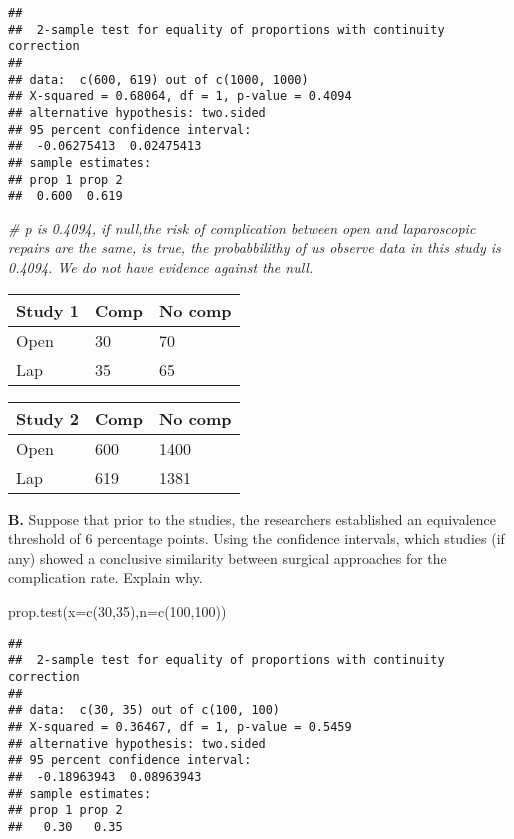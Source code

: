 \documentclass[
]{article}
\newenvironment{Shaded}{\begin{snugshade}}{\end{snugshade}}
\newcommand{\AttributeTok}[1]{\textcolor[rgb]{0.77,0.63,0.00}{#1}}
\newcommand{\CommentTok}[1]{\textcolor[rgb]{0.56,0.35,0.01}{\textit{#1}}}
\newcommand{\DecValTok}[1]{\textcolor[rgb]{0.00,0.00,0.81}{#1}}
\newcommand{\FunctionTok}[1]{\textcolor[rgb]{0.00,0.00,0.00}{#1}}
\newcommand{\NormalTok}[1]{#1}
\begin{document}
\begin{verbatim}
## 
##  2-sample test for equality of proportions with continuity correction
## 
## data:  c(600, 619) out of c(1000, 1000)
## X-squared = 0.68064, df = 1, p-value = 0.4094
## alternative hypothesis: two.sided
## 95 percent confidence interval:
##  -0.06275413  0.02475413
## sample estimates:
## prop 1 prop 2 
##  0.600  0.619
\end{verbatim}

\begin{Shaded}
\begin{Highlighting}[]
\CommentTok{\# p is 0.4094, if null,the risk of complication between open and laparoscopic repairs are the same, is true, the probabbilithy of us observe data in this study is 0.4094. We do not have evidence against the null.}
\end{Highlighting}
\end{Shaded}

\begin{longtable}[]{@{}lll@{}}
\toprule
Study 1 & Comp & No comp \\
\midrule
\endhead
Open & 30 & 70 \\
Lap & 35 & 65 \\
\bottomrule
\end{longtable}

\begin{longtable}[]{@{}lll@{}}
\toprule
Study 2 & Comp & No comp \\
\midrule
\endhead
Open & 600 & 1400 \\
Lap & 619 & 1381 \\
\bottomrule
\end{longtable}

\textbf{B.} Suppose that prior to the studies, the researchers
established an equivalence threshold of 6 percentage points. Using the
confidence intervals, which studies (if any) showed a conclusive
similarity between surgical approaches for the complication rate.
Explain why.

\begin{Shaded}
\begin{Highlighting}[]
\FunctionTok{prop.test}\NormalTok{(}\AttributeTok{x=}\FunctionTok{c}\NormalTok{(}\DecValTok{30}\NormalTok{,}\DecValTok{35}\NormalTok{),}\AttributeTok{n=}\FunctionTok{c}\NormalTok{(}\DecValTok{100}\NormalTok{,}\DecValTok{100}\NormalTok{))}
\end{Highlighting}
\end{Shaded}

\begin{verbatim}
## 
##  2-sample test for equality of proportions with continuity correction
## 
## data:  c(30, 35) out of c(100, 100)
## X-squared = 0.36467, df = 1, p-value = 0.5459
## alternative hypothesis: two.sided
## 95 percent confidence interval:
##  -0.18963943  0.08963943
## sample estimates:
## prop 1 prop 2 
##   0.30   0.35
\end{verbatim}
\end{document}
